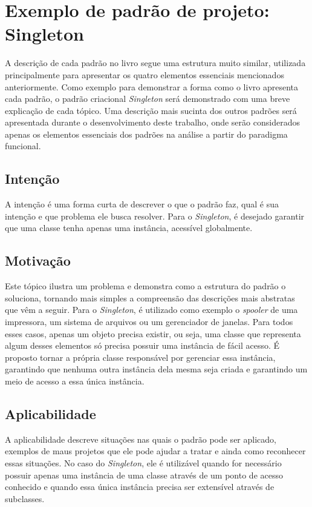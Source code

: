 \section{Exemplo de padrão de projeto: Singleton}

A descrição de cada padrão no livro segue uma estrutura 
muito similar, utilizada principalmente para apresentar 
os quatro elementos essenciais mencionados anteriormente. 
Como exemplo para demonstrar a forma como o livro 
apresenta cada padrão, o padrão criacional \textit{Singleton} será 
demonstrado com uma breve explicação de cada tópico. 
Uma descrição mais sucinta dos outros padrões será 
apresentada durante o desenvolvimento deste 
trabalho, onde serão considerados apenas os elementos 
essenciais dos padrões na análise 
a partir do paradigma funcional.

\subsection*{Intenção}

A intenção é uma forma curta de descrever o que o padrão 
faz, qual é sua intenção e que problema ele busca resolver. 
Para o \textit{Singleton}, é desejado garantir que uma classe 
tenha apenas uma instância, acessível globalmente.

\subsection*{Motivação}

Este tópico ilustra um problema e demonstra como a estrutura 
do padrão o soluciona, tornando mais simples a compreensão 
das descrições mais abstratas que vêm a seguir. Para o 
\textit{Singleton}, é utilizado como exemplo o \textit{spooler} de uma 
impressora, um sistema de arquivos ou um gerenciador de 
janelas. Para todos esses casos, apenas um objeto precisa existir, 
ou seja, uma classe que representa algum desses elementos 
só precisa possuir uma instância de fácil acesso. É proposto 
tornar a própria classe responsável por gerenciar essa 
instância, garantindo que nenhuma outra instância dela 
mesma seja criada e garantindo um meio de acesso a essa 
única instância.

\subsection*{Aplicabilidade}

A aplicabilidade descreve situações nas quais o padrão 
pode ser aplicado, exemplos de maus projetos que ele pode 
ajudar a tratar e ainda como reconhecer essas situações. 
No caso do \textit{Singleton}, ele é utilizável quando for necessário 
possuir apenas uma instância de uma classe através de um 
ponto de acesso conhecido e quando essa única instância 
precisa ser extensível através de subclasses. 


